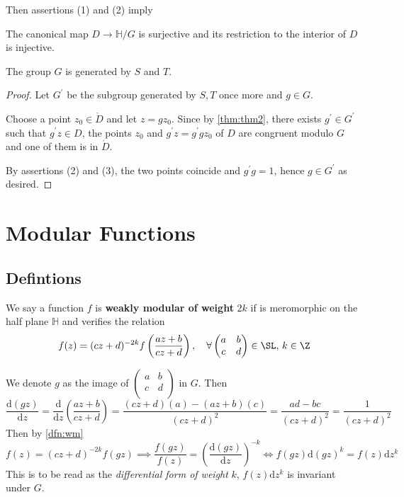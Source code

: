 \documentclass[12pt]{article}
\theoremstyle{definition}
\begin{document}
    Then assertions (1) and (2) imply 
    \begin{cor}
    The canonical map \(D\to \mathbb{H} /G\) is surjective and its restriction to the interior of \(D\) is injective.
    \end{cor}
    \begin{thm}[label = gen]
    The group \(G\) is generated by \(S\) and \(T\).
    \end{thm}
    \begin{proof}
    Let \(G^{\prime} \) be the subgroup generated by \(S,T\) once more and \(g\in G\). 

    Choose a point \(z_0 \in \mathring{D}\) and let \(z=gz_0\). Since by \cref{thm:thm2}, there exists \(g^{\prime} \in G^{\prime} \) such that \(g^{\prime} z \in D\), the points \(z_0\) and \(g^{\prime} z=g^{\prime} gz_0\) of \(D\) are congruent modulo \(G\) and one of them is in \(\mathring{D}\). 
    
    By assertions (2) and (3), the two points coincide and \(g^{\prime} g=1\), hence \(g\in G^{\prime} \) as desired.
    \end{proof}
\section{Modular Functions}
\subsection{Defintions}
\begin{dfn}[label = wm]
We say a function \(f\) is \textbf{weakly modular of weight} \(2k\) if is meromorphic on the half plane \(\mathbb{H}\) and verifies the relation
\[
    f(z)= (cz+d)^{-2k}f\left(\frac{az+b}{cz+d}\right),\quad \forall \begin{pmatrix}
        a &  b \\
        c &  d \\
    \end{pmatrix} \in \SL, \, k\in\Z
\]
\end{dfn} 
We denote \(g\) as the image of $\begin{pmatrix}
    a &  b \\
    c &  d \\
\end{pmatrix}$ in \(G\). Then
\[
    \frac{\mathrm{d}(gz)}{\mathrm{d}z} = \frac{\mathrm{d}}{\mathrm{d}z} \left(\frac{az+b}{cz+d}\right) = \frac{(cz+d)(a)-(az+b)(c)}{(cz+d)^2} = \frac{ad-bc}{(cz+d)^2} = \frac{1}{(cz+d)^2}
\] 
Then by \cref{dfn:wm} 
\[
    f(z) = (cz+d)^{-2k} f(gz) \implies \frac{f(gz)}{f(z)} = \left(\frac{\mathrm{d}(gz)}{\mathrm{d}z} \right)^{-k} \iff f(gz)\mathrm{d}(gz)^k = f(z)\mathrm{d}z^k  
\]
This is to be read as the \textit{differential form of weight} \(k\), \(f(z)\mathrm{d}z^k \) is invariant under \(G\).
\end{document}
